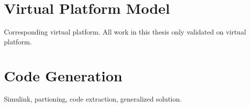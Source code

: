 
 
\section{Virtual Platform Model}

Corresponding virtual platform. All work in this thesis only validated on virtual platform.

\section{Code Generation}
Simulink, partioning, code extraction, generalized solution.



